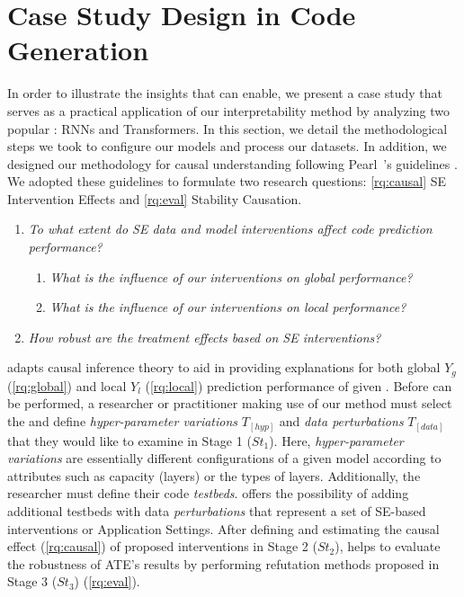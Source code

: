 \section{Case Study Design in Code Generation}\label{sec:design}
In order to illustrate the insights that \codegen can enable, we present a case study that serves as a practical application of our interpretability method by analyzing two popular \nlms: RNNs and Transformers. In this section, we detail the methodological steps we took to configure our models and process our datasets. In addition, we designed our methodology for causal understanding following Pearl~\etal's guidelines \citep{Pearl2016Causality,Sharma2021DoWhyAssumptions}. We adopted these guidelines to formulate two research questions: \ref{rq:causal} SE Intervention Effects and \ref{rq:eval} Stability Causation.

\begin{enumerate}[label=\textbf{RQ$_{\arabic*}$:}, ref=\textbf{RQ$_{\arabic*}$}, wide, labelindent=5pt]\setlength{\itemsep}{0.2em}
      \item \label{rq:causal} {\textit{To what extent do SE data and model interventions affect code prediction performance?}} 
       \begin{enumerate}[label=\textbf{RQ$_{1.\arabic*}$:}, ref=\textbf{RQ$_{1.\arabic*}$}, wide, leftmargin=0.5cm]\setlength{\itemsep}{0.2em}
        \item \label{rq:global}{\textit{What is the influence of our interventions on global performance?}}
        \item \label{rq:local}{\textit{What is the influence of our interventions on local performance?}}
        \end{enumerate}
      \item \label{rq:eval} {\textit{How robust are the treatment effects based on SE interventions?}}
\end{enumerate}

 

\codegen adapts causal inference theory to aid in providing explanations for both global $Y_g$ (\ref{rq:global}) and local $Y_l$ (\ref{rq:local}) prediction performance of given \nlms. Before \codegen can be performed, a researcher or practitioner making use of our method must select the \nlms and define \textit{hyper-parameter variations} $T_{[hyp]}$ and \textit{data perturbations} $T_{[data]}$ that they would like to examine in Stage 1 ($St_1$). Here, \textit{hyper-parameter variations} are essentially different configurations of a given model according to attributes such as capacity (layers) or the types of layers. Additionally, the researcher must define their code \textit{testbeds}. \codegen offers the possibility of adding additional testbeds with data \textit{perturbations} that represent a set of SE-based interventions or Application Settings. After defining and estimating the causal effect (\ref{rq:causal}) of proposed interventions in Stage 2 ($St_2$), \codegen helps to evaluate the robustness of ATE's results by performing refutation methods proposed in Stage 3 ($St_3$) (\ref{rq:eval}).

